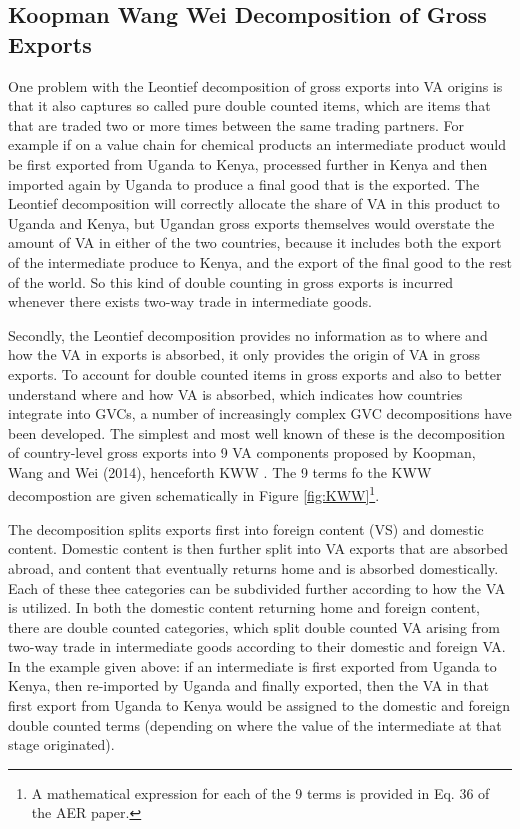 \documentclass[a4paper]{article}
\begin{document}
\subsection{Koopman Wang Wei Decomposition of Gross Exports}
One problem with the Leontief decomposition of gross exports into VA origins is that it also captures so called pure double counted items, which are items that that are traded two or more times between the same trading partners. For example if on a value chain for chemical products an intermediate product would be first exported from Uganda to Kenya, processed further in Kenya and then imported again by Uganda to produce a final good that is the exported. The Leontief decomposition will correctly allocate the share of VA in this product to Uganda and Kenya, but Ugandan gross exports themselves would overstate the amount of VA in either of the two countries, because it includes both the export of the intermediate produce to Kenya, and the export of the final good to the rest of the world. So this kind of double counting in gross exports is incurred whenever there exists two-way trade in intermediate goods. \newline

Secondly, the Leontief decomposition provides no information as to where and how the VA in exports is absorbed, it only provides the origin of VA in gross exports. To account for double counted items in gross exports and also to better understand where and how VA is absorbed, which indicates how countries integrate into GVCs, a number of increasingly complex GVC decompositions have been developed. The simplest and most well known of these is the decomposition of country-level gross exports into 9 VA components proposed by Koopman, Wang and Wei (2014), henceforth KWW \citep{koopman2014tracing}. The 9 terms fo the KWW decompostion are given schematically in Figure \ref{fig:KWW}\footnote{A mathematical expression for each of the 9 terms is provided in Eq. 36 of the \citet{koopman2014tracing} AER paper.}. \newline

The decomposition splits exports first into foreign content (VS) and domestic content. Domestic content is then further split into VA exports that are absorbed abroad, and content that eventually returns home and is absorbed domestically. Each of these thee categories can be subdivided further according to how the VA is utilized. In both the domestic content returning home and foreign content, there are double counted categories, which split double counted VA arising from two-way trade in intermediate goods according to their domestic and foreign VA. In the example given above: if an intermediate is first exported from Uganda to Kenya, then re-imported by Uganda and finally exported, then the VA in that first export from Uganda to Kenya would be assigned to the domestic and foreign double counted terms (depending on where the value of the intermediate at that stage originated). 
\end{document}

